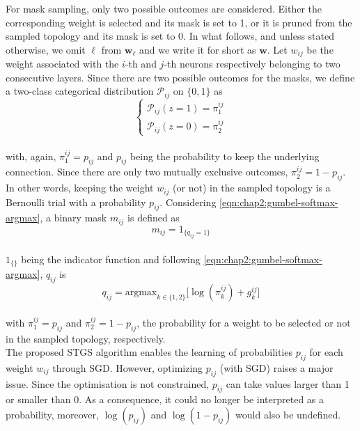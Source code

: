 For mask sampling, only two possible outcomes are considered. Either the
corresponding weight is selected and its mask is set to 1, or it is pruned from
the sampled topology and its mask is set to 0. In what follows, and unless
stated otherwise, we omit $\ell$ from $\bm{w}_\ell$ and we write it for short as
$\bm{w}$. Let $w_{ij}$ be the weight associated with the $i$-th and $j$-th neurons
respectively belonging to two consecutive layers. Since there are two possible
outcomes for the masks, we define a two-class categorical distribution
$\mathcal{P}_{ij}$ on $\{0,1\}$ as\\

\begin{equation}
  \left\{ \begin{array}{c}
    \mathcal{P}_{ij}(z=1)=\pi_1^{ij} \\
    \mathcal{P}_{ij}(z=0)=\pi_2^{ij}
  \end{array} \right.
\end{equation}\\

with, again, $\pi_1^{ij}=p_{ij}$ and $p_{ij}$ being the probability to keep the
underlying connection. Since there are only two mutually exclusive outcomes,
$\pi_2^{ij}=1-p_{ij}$. In other words, keeping the weight $w_{ij}$ (or not)
in the sampled topology is a Bernoulli trial with a probability $p_{ij}$.
Considering \cref{eqn:chap2:gumbel-softmax-argmax}, a binary mask  $m_{ij}$
is defined as\\

\begin{equation}
  \label{eqn:chap2:mask_value}
  m_{ij} = 1_{\{q_{ij}=1\}}
\end{equation}\\

$1_{\{\}}$ being the indicator function and following
\cref{eqn:chap2:gumbel-softmax-argmax}, $q_{ij}$ is\\

\begin{equation}
  \label{eqn:chap2:q_ij_expression}
  q_{ij} = {\text{argmax}_{k \in \{1,2\}}}\big[\log(\pi_k^{ij})+g_k^{ij}\big]
\end{equation}\\

with $\pi^{ij}_1 = p_{ij}$ and $\pi^{ij}_2 = 1-p_{ij}$, the probability for a
weight to be selected or not in the sampled topology, respectively.\\

The proposed \ac{STGS} algorithm enables the learning of probabilities
$p_{ij}$ for each weight $w_{ij}$ through \ac{SGD}. However, optimizing
$p_{ij}$ (with \ac{SGD}) raises a major issue. Since the optimisation is not
constrained, $p_{ij}$ can take values larger than 1 or smaller than 0. As a
consequence, it could no longer be interpreted as a probability, moreover,
$\log(p_{ij})$ and $\log(1-p_{ij})$ would also be undefined.\\

